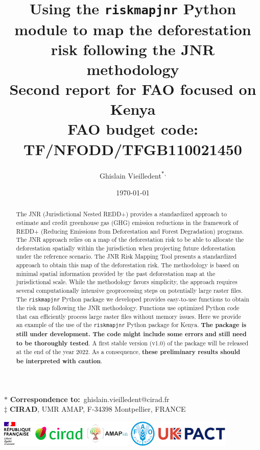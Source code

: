 \documentclass[paper=a4, 12pt, DIV=12]{scrartcl}
\author{Ghislain Vieilledent\textsuperscript{\(\ast\), \ddag{}}}
\date{\today}
\title{Using the \texttt{riskmapjnr} Python module to map the deforestation risk following the JNR methodology\\\medskip
\large \textcolor{pnasblue}{Second report for FAO focused on Kenya\\ FAO budget code: TF/NFODD/TFGB110021450}}
\begin{document}
\maketitle

\vspace{-1cm}
\begin{center}
  $\ast$ \textbf{Correspondence to:}~ghislain.vieilledent@cirad.fr \\
  $\ddag$ \textbf{CIRAD}, UMR AMAP, F-34398 Montpellier, FRANCE \\
\end{center}
\vspace{0.25cm}

\begin{abstract}
The JNR (Jurisdictional Nested REDD+) provides a standardized approach to estimate and credit greenhouse gas (GHG) emission reductions in the framework of REDD+ (Reducing Emissions from Deforestation and Forest Degradation) programs. The JNR approach relies on a map of the deforestation risk to be able to allocate the deforestation spatially within the jurisdiction when projecting future deforestation under the reference scenario. The JNR Risk Mapping Tool presents a standardized approach to obtain this map of the deforestation risk. The methodology is based on minimal spatial information provided by the past deforestation map at the jurisdictional scale. While the methodology favors simplicity, the approach requires several computationally intensive geoprocessing steps on potentially large raster files. The \texttt{riskmapjnr} Python package we developed provides easy-to-use functions to obtain the risk map following the JNR methodology. Functions use optimized Python code that can efficiently process large raster files without memory issues. Here we provide an example of the use of the \texttt{riskmapjnr} Python package for Kenya. \textbf{The package is still under development. The code might include some errors and still need to be thoroughly tested}. A first stable version (v1.0) of the package will be released at the end of the year 2022. As a consequence, \textbf{these preliminary results should be interpreted with caution}.
\end{abstract}

\vspace{0.25cm}
\begin{center}
\includegraphics[width=0.86\textwidth]{images/partners_logos.png}\enlargethispage{2\baselineskip}
\end{center}
\newpage
\tableofcontents
\newpage
\listoffigures
\newpage
\end{document}
